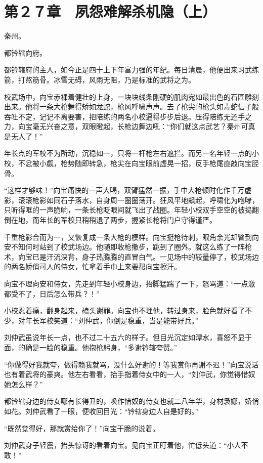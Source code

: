 \section{第２７章　夙怨难解杀机隐（上）}

秦州。

都钤辖向府。

都钤辖府的主人，如今正是四十上下年富力强的年纪。每日清晨，他便出来习武练箭，打熬筋骨。冰雪无碍，风雨无阻，乃是标准的武将之为。

校武场中，向宝赤裸着健壮的上身，一块块线条刚硬的肌肉宛如最出色的石匠雕刻出来。他将一条大枪舞得矫如龙蛇，枪风呼啸声声。去了枪尖的枪头如毒蛇信子般吞吐不定，记记不离要害，把陪练的两名小校逼得步步后退。压得陪练无还手之力，向宝毫无兴奋之意，双眼瞪起，长枪边舞边吼：“你们就这点武艺？秦州可真是无人了！”

年长点的军校不为所动，沉稳如一，只将一杆枪左右遮拦。而另一名年轻一点的小校，不忿被小觑，枪势随即转急，枪尖在向宝眼前虚晃一招，反手枪尾直敲向宝胫骨。

“这样才够味！”向宝痛快的一声大喝，双臂猛然一振，手中大枪顿时化作千万虚影，滚滚枪影如同石子落水，自身周一圈圈荡开。狂风平地飙起，呼啸化为咆哮，只听得哐的一声脆响，一条长枪眨眼间就飞出了战圈。年轻小校双手空空的被捣翻倒在地，而年长的军校只稍稍退了两步，握紧长枪将门户守得谨严。

千重枪影合而为一，又恢复成一条大枪的模样。向宝挺枪待刺，眼角余光却瞥到向安不知何时站到了校武场边。他随即收枪撤步，跳到了圈外。就这么练了一阵枪术，向宝已是汗流浃背，身子热腾腾的直冒白气。一见场中的较量停了，校武场边的两名娇俏可人的侍女，忙拿着手巾上来要帮向宝擦汗。

向宝不理向安和侍女，先走到年轻小校身边，抬脚猛踹了一下，怒骂道：“一点激都受不了，日后怎么带兵？！”

小校忍着痛，翻身起来，磕头谢罪。向宝也不理他，转过身来，脸色就好看了不少，对年长军校笑道：“刘仲武，你倒是稳重，当是能带好兵。”

刘仲武虽说年长一点，也不过二十五六的样子。但目光沉定如潭水，喜怒不显于面，的确是一脸的稳重。他抱枪躬身，“多谢钤辖夸赞。”

“你做得好我就夸，做得赖我就骂，没什么好谢的！等我赏你再谢不迟！”向宝说话也有着武将的豪爽。他左右看看，抬手指着侍女中的一人，“刘仲武，你觉得惜奴她怎么样？”

都钤辖身边的侍女哪有长得丑的，唤作惜奴的侍女也就二八年华，身材袅娜，娇俏如花。刘仲武看了一眼，便收回目光：“钤辖身边人自是好的。”

“既然觉得好，那就赏给你了！”向宝干脆的说着。

刘仲武身子轻震，抬头惊讶的看着向宝。见向宝正盯着他，忙低头道：“小人不敢！”

